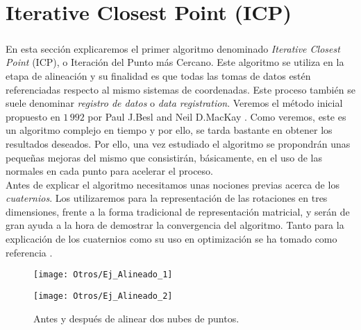 \chapter{Iterative Closest Point (ICP)}
	\thispagestyle{empty}
	
	\newcommand{\ii}{\textbf{\emph{i}}}
	\newcommand{\jj}{\textbf{\emph{j}}}
	\newcommand{\kk}{\textbf{\emph{k}}}
	\newcommand{\qq}{\textbf{\emph{q}}}
	\newcommand{\pp}{\textbf{\emph{p}}}
	\newcommand{\vv}{\textbf{\emph{v}}}
	\newcommand{\xx}{\textbf{\emph{x}}}
	\newcommand{\uu}{\textbf{\emph{u}}}
	\newcommand{\ww}{\textbf{\emph{w}}}
	\newcommand{\aaa}{\textbf{\emph{a}}}
	\newcommand{\nn}{\textbf{\emph{n}}}
	\newcommand{\bb}{\textbf{\emph{b}}}
	
	\paragraph{}En esta sección explicaremos el primer algoritmo denominado \textit{Iterative Closest Point} (ICP), o Iteración del Punto más Cercano. Este algoritmo se utiliza en la etapa de alineación y su finalidad es que todas las tomas de datos estén referenciadas respecto al mismo sistemas de coordenadas. Este proceso también se suele denominar \textit{registro de datos} o \textit{data registration}. Veremos el método inicial propuesto en $ 1\,992 $ por Paul J.Besl and Neil D.MacKay \cite{ICPBesl}. Como veremos, este es un algoritmo complejo en tiempo y por ello, se tarda bastante en obtener los resultados deseados. Por ello, una vez estudiado el algoritmo se propondrán unas pequeñas mejoras del mismo que consistirán, básicamente, en el uso de las normales en cada punto para acelerar el proceso.\\
	
	Antes de explicar el algoritmo necesitamos unas nociones previas acerca de los \textit{cuaternios}. Los utilizaremos para la representación de las rotaciones en tres dimensiones, frente a la forma tradicional de representación matricial, y serán de gran ayuda a la hora de demostrar la convergencia del algoritmo. Tanto para la explicación de los cuaternios como su 
	uso en optimización se ha tomado como referencia \cite{QuatYan}.
\begin{figure}[h!]
	\begin{minipage}{0.5\textwidth}
		\texttt{[image: Otros/Ej\_Alineado\_1]} 
	\end{minipage}
	\begin{minipage}{0.5\textwidth}
		\texttt{[image: Otros/Ej\_Alineado\_2]}
	\end{minipage}
	\caption{Antes y después de alinear dos nubes de puntos.}
\end{figure}

